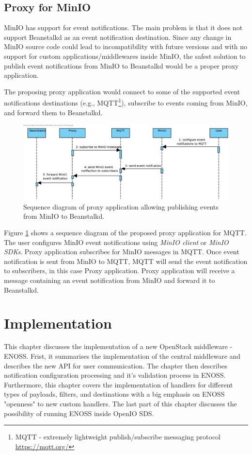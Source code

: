 \section{Proxy for MinIO}
    MinIO has support for event notifications. The main problem is that it does not support Beanstalkd as an event notification destination. Since any change in MinIO source code could lead to incompatibility with future versions and with no support for custom applications/middlewares inside MinIO, the safest solution to publish event notifications from MinIO to Beanstalkd would be a proper proxy application.

    The proposing proxy application would connect to some of the supported event notifications destinations (e.g., MQTT\footnote{MQTT - extremely lightweight publish/subscribe messaging protocol {\url{https://mqtt.org/}}}), subscribe to events coming from MinIO, and forward them to Beanstalkd.

    \begin{figure}[H]
        \centering
        \includegraphics[angle=90,height=0.78\textheight]{obrazky-figures/minio-proxy.eps}
        \caption{Sequence diagram of proxy application allowing publishing events from MinIO to Beanstalkd.}
        \label{fig:minioProxy}
    \end{figure}

    Figure \ref{fig:minioProxy} shows a sequence diagram of the proposed proxy application for MQTT. The user configures MinIO event notifications using \textit{MinIO client} or \textit{MinIO SDKs}. Proxy application subscribes for MinIO messages in MQTT. Once event notification is sent from MinIO to MQTT, MQTT will send the event notification to subscribers, in this case Proxy application. Proxy application will receive a message containing an event notification from MinIO and forward it to Beanstalkd.


\chapter{Implementation}\label{chap:implementation}
    This chapter discusses the implementation of a new OpenStack middleware - ENOSS. Frist, it summarises the implementation of the central middleware and describes the new API for user communication. The chapter then describes notification configuration processing and it's validation process in ENOSS. Furthermore, this chapter covers the implementation of handlers for different types of payloads, filters, and destinations with a big emphasis on ENOSS "openness" to new custom handlers. The last part of this chapter discusses the possibility of running ENOSS inside OpenIO SDS.

